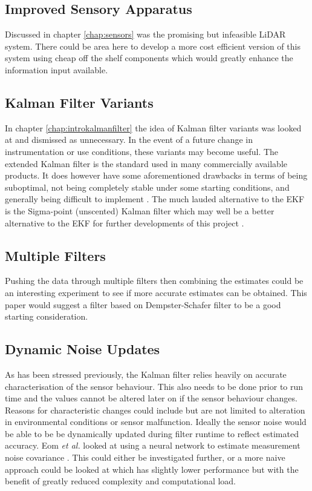 \subsection{Improved Sensory Apparatus}
Discussed in chapter \ref{chap:sensors} was the promising but infeasible LiDAR system. There could be area here to develop a more cost efficient version of this system using cheap off the shelf components which would greatly enhance the information input available.

\subsection{Kalman Filter Variants}
In chapter \ref{chap:introkalmanfilter} the idea of Kalman filter variants was looked at and dismissed as unnecessary. In the event of a future change in instrumentation or use conditions, these variants may become useful. The extended Kalman filter is the standard used in many commercially available products. It does however have some aforementioned drawbacks in terms of being suboptimal, not being completely stable under some starting conditions, and generally being difficult to implement \cite{julier2004unscented}. The much lauded alternative to the EKF is the Sigma-point (unscented) Kalman filter which may well be a better alternative to the EKF for further developments of this project \cite{van2004sigma}.

\subsection{Multiple Filters}
Pushing the data through multiple filters then combining the estimates could be an interesting experiment to see if more accurate estimates can be obtained. This paper would suggest a filter based on Dempster-Schafer filter to be a good starting consideration.

\subsection{Dynamic Noise Updates}
As has been stressed previously, the Kalman filter relies heavily on accurate characterisation of the sensor behaviour. This also needs to be done prior to run time and the values cannot be altered later on if the sensor behaviour changes. Reasons for characteristic changes could include but are not limited to alteration in environmental conditions or sensor malfunction. Ideally the sensor noise would be able to be be dynamically updated during filter runtime to reflect estimated accuracy. Eom \textit{et al.} looked at using a neural network to estimate measurement noise covariance \cite{eom2011improved}. This could either be investigated further, or a more naive approach could be looked at which has slightly lower performance but with the benefit of greatly reduced complexity and computational load.